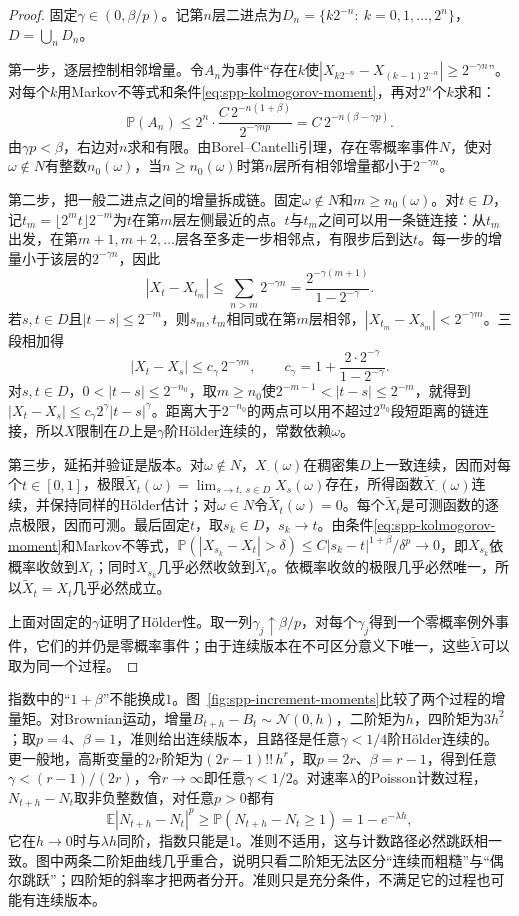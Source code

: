 \begin{proof}
固定$\gamma\in(0,\beta/p)$。记第$n$层二进点为$D_n=\{k2^{-n}:\ k=0,1,\ldots,2^n\}$，$D=\bigcup_nD_n$。

第一步，逐层控制相邻增量。令$A_n$为事件“存在$k$使$|X_{k2^{-n}}-X_{(k-1)2^{-n}}|\ge2^{-\gamma n}$”。对每个$k$用Markov不等式和条件\eqref{eq:spp-kolmogorov-moment}，再对$2^n$个$k$求和：
\[
  \mathbb P(A_n)\le2^n\cdot\frac{C\,2^{-n(1+\beta)}}{2^{-\gamma np}}=C\,2^{-n(\beta-\gamma p)} .
\]
由$\gamma p<\beta$，右边对$n$求和有限。由Borel--Cantelli引理，存在零概率事件$N$，使对$\omega\notin N$有整数$n_0(\omega)$，当$n\ge n_0(\omega)$时第$n$层所有相邻增量都小于$2^{-\gamma n}$。

第二步，把一般二进点之间的增量拆成链。固定$\omega\notin N$和$m\ge n_0(\omega)$。对$t\in D$，记$t_m=\lfloor2^mt\rfloor2^{-m}$为$t$在第$m$层左侧最近的点。$t$与$t_m$之间可以用一条链连接：从$t_m$出发，在第$m+1,m+2,\ldots$层各至多走一步相邻点，有限步后到达$t$。每一步的增量小于该层的$2^{-\gamma n}$，因此
\[
  |X_t-X_{t_m}|\le\sum_{n>m}2^{-\gamma n}=\frac{2^{-\gamma(m+1)}}{1-2^{-\gamma}} .
\]
若$s,t\in D$且$|t-s|\le2^{-m}$，则$s_m,t_m$相同或在第$m$层相邻，$|X_{t_m}-X_{s_m}|<2^{-\gamma m}$。三段相加得
\[
  |X_t-X_s|\le c_\gamma\,2^{-\gamma m},\qquad c_\gamma=1+\frac{2\cdot2^{-\gamma}}{1-2^{-\gamma}} .
\]
对$s,t\in D$，$0<|t-s|\le2^{-n_0}$，取$m\ge n_0$使$2^{-m-1}<|t-s|\le2^{-m}$，就得到$|X_t-X_s|\le c_\gamma2^\gamma|t-s|^\gamma$。距离大于$2^{-n_0}$的两点可以用不超过$2^{n_0}$段短距离的链连接，所以$X$限制在$D$上是$\gamma$阶Hölder连续的，常数依赖$\omega$。

第三步，延拓并验证是版本。对$\omega\notin N$，$X_\cdot(\omega)$在稠密集$D$上一致连续，因而对每个$t\in[0,1]$，极限$\tilde X_t(\omega)=\lim_{s\to t,\,s\in D}X_s(\omega)$存在，所得函数$\tilde X_\cdot(\omega)$连续，并保持同样的Hölder估计；对$\omega\in N$令$\tilde X_t(\omega)=0$。每个$\tilde X_t$是可测函数的逐点极限，因而可测。最后固定$t$，取$s_k\in D$，$s_k\to t$。由条件\eqref{eq:spp-kolmogorov-moment}和Markov不等式，$\mathbb P(|X_{s_k}-X_t|>\delta)\le C|s_k-t|^{1+\beta}/\delta^p\to0$，即$X_{s_k}$依概率收敛到$X_t$；同时$X_{s_k}$几乎必然收敛到$\tilde X_t$。依概率收敛的极限几乎必然唯一，所以$\tilde X_t=X_t$几乎必然成立。

上面对固定的$\gamma$证明了Hölder性。取一列$\gamma_j\uparrow\beta/p$，对每个$\gamma_j$得到一个零概率例外事件，它们的并仍是零概率事件；由于连续版本在不可区分意义下唯一，这些$\tilde X$可以取为同一个过程。
\end{proof}

指数中的“$1+\beta$”不能换成$1$。图~\ref{fig:spp-increment-moments}比较了两个过程的增量矩。对Brownian运动，增量$B_{t+h}-B_t\sim\mathcal N(0,h)$，二阶矩为$h$，四阶矩为$3h^2$；取$p=4$、$\beta=1$，准则给出连续版本，且路径是任意$\gamma<1/4$阶Hölder连续的。更一般地，高斯变量的$2r$阶矩为$(2r-1)!!\,h^r$，取$p=2r$、$\beta=r-1$，得到任意$\gamma<(r-1)/(2r)$，令$r\to\infty$即任意$\gamma<1/2$。对速率$\lambda$的Poisson计数过程，$N_{t+h}-N_t$取非负整数值，对任意$p>0$都有
\[
  \mathbb E|N_{t+h}-N_t|^p\ge\mathbb P(N_{t+h}-N_t\ge1)=1-e^{-\lambda h},
\]
它在$h\to0$时与$\lambda h$同阶，指数只能是$1$。准则不适用，这与计数路径必然跳跃相一致。图中两条二阶矩曲线几乎重合，说明只看二阶矩无法区分“连续而粗糙”与“偶尔跳跃”；四阶矩的斜率才把两者分开。准则只是充分条件，不满足它的过程也可能有连续版本。

